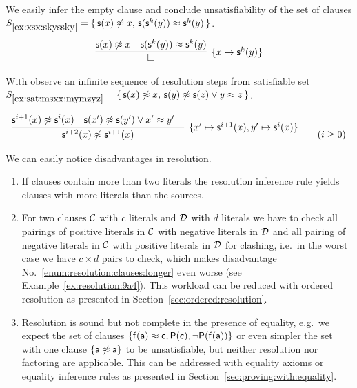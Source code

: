 \begin{example}\label{ex:xsx:skyssky}
	We easily infer the empty clause and
	conclude unsatisfiability of the set of clauses
	\( S_{\ref{ex:xsx:skyssky}} = \{ \,
	{ \mathsf{s}(x)\not\approx x}, \,
	{ \mathsf{s}(\mathsf{s}^k(y))\approx\mathsf{s}^k(y) }
	 \, \} \).
	\begin{gather*}
	\infer[ \{ x\mapsto\msucc^k(y) \}]
	{
		\square
	}
	{
		\msucc(x)\mNE x & \msucc(\msucc^k(y))\mEQ\msucc^k(y)
	}
	\end{gather*}
\end{example}

\begin{example}\label{ex:sat:msxx:mymzyz}
	With observe an infinite sequence of resolution steps from satisfiable set
	\(
		S_{\ref{ex:sat:msxx:mymzyz}} =
		 \{ \,
		\mathsf{s}(x)\not\approx x, \, \mathsf{s}(y)\not\approx\mathsf{s}(z) \lor y\approx z
		 \, \}
	 \).

	\begin{gather*}
	\infer
	[ \{ x'\mapsto\msucc^{i+1}(x), y'\mapsto\msucc^{i}(x)\}]
	{
		\msucc^{i+2}(x) \mNE\msucc^{i+1}(x)
	}{
		\msucc^{i+1}(x)\mNE \msucc^i(x) & \msucc(x')\mNE\msucc(y')\lor x'\mEQ y'
		&
	}
	\tag{\( i\geq 0 \)}
	\end{gather*}
\end{example}



We can easily notice disadvantages in resolution.

\begin{enumerate}
	\item\label{enum:resolution:clauses:longer}
	If clauses contain more than two literals the resolution inference rule
	yields clauses with more literals than the sources.

	\item\label{enum:resolution:clauses:multiple}
	For two clauses \( \mathcal{C} \) with \( c \) literals
	and \( \mathcal{D} \) with \( d \) literals
	we have to check all pairings
	of positive literals in \( \mathcal{C} \)
	with negative literals in \( \mathcal{D} \)
	and all pairing of negative literals in \( \mathcal{C} \)
	with positive literals in \( \mathcal{D} \) for clashing,
	i.e.~in the worst case we have \( c\times d \) pairs to check,
	which makes disadvantage No.~\ref{enum:resolution:clauses:longer} even worse
	(see Example~\ref{ex:resolution:9a4}).
	This workload can be reduced with ordered resolution as presented
	in Section~\ref{sec:ordered:resolution}.

	\item Resolution is sound but not complete in the presence of equality,
	e.g.~we expect the set of clauses
	\( \{ \mathsf{f}(\mathsf{a}) \approx \mathsf{c}, \mathsf{P}(\mathsf{c}), \lnot\mathsf{P}(\mathsf{f}(\mathsf{a})) \} \)
	or even simpler the set with one clause
	\( \{ \mathsf{a}\not\approx\mathsf{a} \} \)
	to be unsatisfiable, but neither resolution nor factoring
	are applicable. This can be addressed with equality axioms or equality inference rules
	as presented in Section~\ref{sec:proving:with:equality}.
\end{enumerate}

